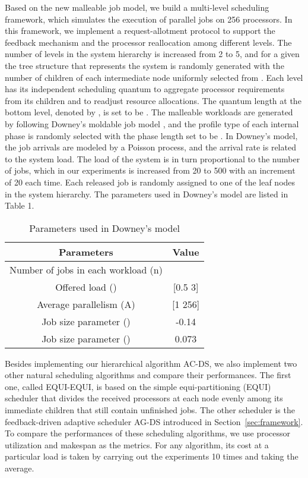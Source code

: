 \documentclass[10pt, a4paper]{article}
\newcommand{\secref}[1]         {Section~\ref{sec:#1}}
\begin{document}
Based on the new malleable job model, we build a multi-level scheduling framework, which simulates
the execution of parallel jobs on 256 processors. In this framework, we implement a
request-allotment protocol to support the feedback mechanism and the processor reallocation among
different levels. The number of levels  in the system hierarchy is increased from 2 to 5, and
for a given  the tree structure that represents the system is randomly generated with the number
of children of each intermediate node uniformly selected from . Each level has its
independent scheduling quantum to aggregate processor requirements from its children and to
readjust resource allocations. The quantum length at the bottom level, denoted by , is set to be
. The malleable workloads are generated by following Downey's moldable job model
\cite{Downey98}, and the profile type of each internal phase is randomly selected with the phase
length set to be . In Downey's model, the job arrivals are modeled by a Poisson process,
and the arrival rate is related to the system load. The load of the system is in turn proportional
to the number of jobs, which in our experiments is increased from 20 to 500 with an increment of 20
each time. Each released job is randomly assigned to one of the leaf nodes in the system hierarchy.
The parameters used in Downey's model are listed in Table 1.

\begin{table}[h]
\caption{Parameters used in Downey's model}
\begin{center}
\begin{tabular}{|c|c|}
  \hline
  Parameters & Value  \\
  \hline \hline
  Number of jobs in each workload (n) &  \\
Offered load () & [0.5 3] \\
Average parallelism (A) & [1 256] \\
Job size parameter () & -0.14 \\
Job size parameter () & 0.073 \\
  \hline
\end{tabular}
\end{center}
\label{table:TB1}
\end{table}

Besides implementing our hierarchical algorithm AC-DS, we also implement two other natural
scheduling algorithms and compare their performances. The first one, called EQUI-EQUI, is based on
the simple equi-partitioning (EQUI) scheduler \cite{Edmonds99,EdmondsChBr03} that divides the
received processors at each node evenly among its immediate children that still contain unfinished
jobs. The other scheduler is the feedback-driven adaptive scheduler AG-DS introduced in
\secref{framework}. To compare the performances of these scheduling algorithms, we use processor
utilization and makespan as the metrics. For any algorithm, its cost at a particular load is taken
by carrying out the experiments 10 times and taking the average.
\end{document}
